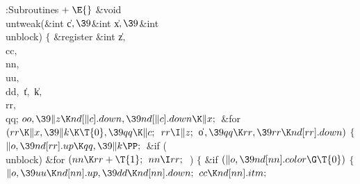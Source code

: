 \Y\B\4:Subroutines\X${}\mathrel+\E{}$\6
\1\1\&{void} \\{untweak}(\&{int} \|c${},\39{}$\&{int} \|x${},\39{}$\&{int} %
\\{unblock})\2\2\6
${}\{{}$\1\6
\&{register} \&{int} \|z${},{}$ \\{cc}${},{}$ \\{nn}${},{}$ \\{uu}${},{}$ %
\\{dd}${},{}$ \|t${},{}$ \|k${},{}$ \\{rr}${},{}$ \\{qq};\7
${}\\{oo},\39\|z\K\\{nd}[\|c].\\{down},\39\\{nd}[\|c].\\{down}\K\|x;{}$\6
\&{for} ${}(\\{rr}\K\|x,\39\|k\K\T{0},\39\\{qq}\K\|c;{}$ ${}\\{rr}\I\|z;{}$ %
\|o${},\39\\{qq}\K\\{rr},\39\\{rr}\K\\{nd}[\\{rr}].\\{down}){}$\5
${}\{{}$\1\6
${}\|o,\39\\{nd}[\\{rr}].\\{up}\K\\{qq},\39\|k\PP;{}$\6
\&{if} (\\{unblock})\1\6
\&{for} ${}(\\{nn}\K\\{rr}+\T{1};{}$ ${}\\{nn}\I\\{rr};{}$ \,)\5
${}\{{}$\1\6
\&{if} ${}(\|o,\39\\{nd}[\\{nn}].\\{color}\G\T{0}){}$\5
${}\{{}$\1\6
${}\|o,\39\\{uu}\K\\{nd}[\\{nn}].\\{up},\39\\{dd}\K\\{nd}[\\{nn}].\\{down};{}$\6
${}\\{cc}\K\\{nd}[\\{nn}].\\{itm};{}$\6

